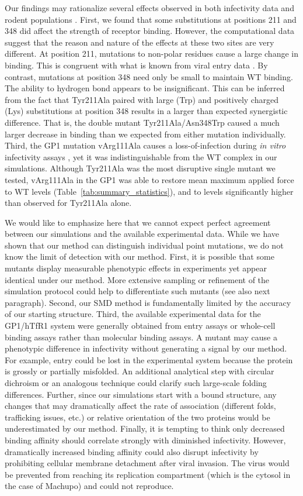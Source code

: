 \documentclass[journal=jacsat,manuscript=article]{achemso}
\begin{document}
Our findings may rationalize several effects observed in both infectivity data and rodent populations \cite{Rad2008,Rad20111}. First, we found that some substitutions at positions 211 and 348 did affect the strength of receptor binding. However, the computational data suggest that the reason and nature of the effects at these two sites are very different. At position 211, mutations to non-polar residues cause a large change in binding. This is congruent with what is known from viral entry data \cite{Rad2008,Rad20111}. By contrast, mutations at position 348 need only be small to maintain WT binding. The ability to hydrogen bond appears to be insignificant. This can be inferred from the fact that Tyr211Ala paired with large (Trp) and positively charged (Lys) substitutions at position 348 results in a larger than expected synergistic difference. That is, the double mutant Tyr211Ala/Asn348Trp caused a much larger decrease in binding than we expected from either mutation individually. Third, the GP1 mutation vArg111Ala causes a loss-of-infection during \textit{in vitro} infectivity assays \cite{Rad20112}, yet it was indistinguishable from the WT complex in our simulations. Although Tyr211Ala was the most disruptive single mutant we tested, vArg111Ala in the GP1 was able to restore mean maximum applied force to WT levels (Table~\ref{tab:summary_statistics}), and to levels significantly higher than observed for Tyr211Ala alone.

We would like to emphasize here that we cannot expect perfect agreement between our simulations and the available experimental data. While we have shown that our method can distinguish individual point mutations, we do not know the limit of detection with our method. First, it is possible that some mutants display measurable phenotypic effects in experiments yet appear identical under our method. More extensive sampling or refinement of the simulation protocol could help to differentiate such mutants (see also next paragraph). Second, our SMD method is fundamentally limited by the accuracy of our starting structure. Third, the available experimental data for the GP1/hTfR1 system were generally obtained from entry assays or whole-cell binding assays rather than molecular binding assays. A mutant may cause a phenotypic difference in infectivity without generating a signal by our method. For example, entry could be lost in the experimental system because the protein is grossly or partially misfolded. An additional analytical step with circular dichroism or an analogous technique could clarify such large-scale folding differences. Further, since our simulations start with a bound structure, any changes that may dramatically affect the rate of association (different folds, trafficking issues, etc.) or relative orientation of the two proteins would be underestimated by our method. Finally, it is tempting to think only decreased binding affinity should correlate strongly with diminished infectivity. However, dramatically increased binding affinity could also disrupt infectivity by prohibiting cellular membrane detachment after viral invasion. The virus would be prevented from reaching its replication compartment (which is the cytosol in the case of Machupo) and could not reproduce.
\end{document}
